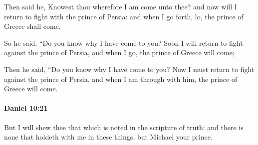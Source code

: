 			\begin{versebox}
					\item[BHS] 
					\item[LXX] 
					\item[ASV] Then said he, Knowest thou wherefore I am come unto thee? and now will I return to fight with the prince of Persia: and when I go forth, lo, the prince of Greece shall come.
					\item[NIV] So he said, “Do you know why I have come to you? Soon I will return to fight against the prince of Persia, and when I go, the prince of Greece will come;
					\item[NRSV] Then he said, “Do you know why I have come to you? Now I must return to fight against the prince of Persia, and when I am through with him, the prince of Greece will come.
			\end{versebox}

		\paragraph{Daniel 10:21} %
			\label{DANIEL-10-21}

			But I will shew thee that which is noted in the scripture of truth: and there is none that holdeth with me in these things, but Michael your prince.

